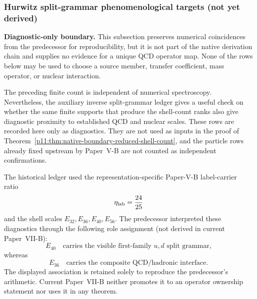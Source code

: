 \documentclass[12pt,a4paper]{article}
\begin{document}



\subsubsection{Hurwitz split-grammar phenomenological targets (not yet derived)}
\label{p11:subsec:split-grammar-numerical-diagnostics}

\textbf{Diagnostic-only boundary.}
This subsection preserves numerical coincidences from the predecessor for reproducibility, but it is not part of the native derivation chain and supplies no evidence for a unique QCD operator map.  None of the rows below may be used to choose a source member, transfer coefficient, mass operator, or nuclear interaction.

The preceding finite count is independent of numerical spectroscopy.  Nevertheless, the auxiliary inverse split-grammar ledger gives a useful check on whether the same finite supports that produce the shell-count ranks also give diagnostic proximity to established QCD and nuclear scales.  These rows are recorded here only as diagnostics.  They are not used as inputs in the proof of Theorem~\ref{p11:thm:native-boundary-reduced-shell-count}, and the particle rows already fixed upstream by Paper~V-B are not counted as independent confirmations.

The historical ledger used the representation-specific Paper-V-B label-carrier ratio
\[
        \eta_{\rm lab}=\frac{24}{25}
\]
and the shell scales \(E_{32},E_{36},E_{40},E_{56}\).  The predecessor interpreted these diagnostics through the following role assignment (not derived in current Paper~VII-B):
\[
        E_{40}
        \quad\text{carries the visible first-family }u,d\text{ split grammar,}
\]
whereas
\[
        E_{36}
        \quad\text{carries the composite QCD/hadronic interface.}
\]
The displayed association is retained solely to reproduce the predecessor's arithmetic.  Current Paper~VII-B neither promotes it to an operator ownership statement nor uses it in any theorem.
\end{document}
